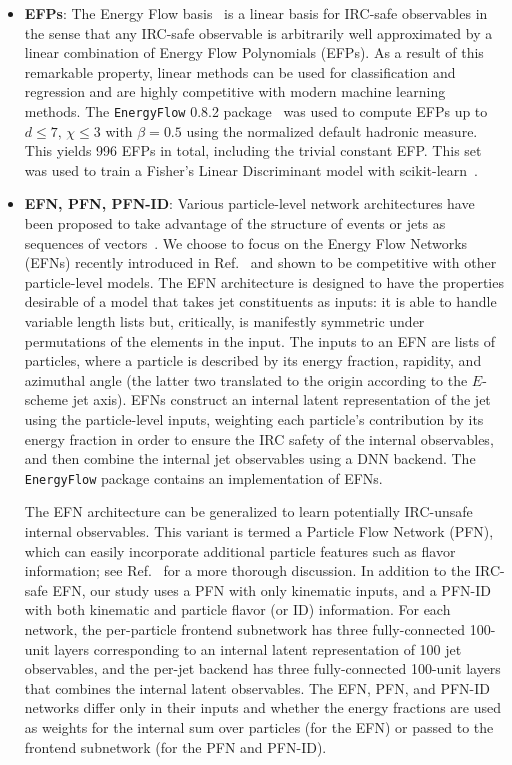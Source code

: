 \documentclass[letterpaper,11pt]{article}
\DeclareRobustCommand{\Ref}[1]{Ref.~\cite{#1}}
\providecommand{\href}[2]{#2}
\begin{document}
\begin{itemize}
\item \textbf{EFPs}: The Energy Flow basis~\cite{Komiske:2017aww} is a linear basis for IRC-safe observables in the sense that any IRC-safe observable is arbitrarily well approximated by a linear combination of Energy Flow Polynomials (EFPs).
%
As a result of this remarkable property, linear methods can be used for classification and regression and are highly competitive with modern machine learning methods.
%
The \href{https://energyflow.network}{\texttt{EnergyFlow}} 0.8.2 package~\cite{energyflow} was used to compute EFPs up to $d\le7,\,\chi\le3$ with $\beta=0.5$ using the normalized default hadronic measure.
%
This yields 996 EFPs in total, including the trivial constant EFP.
%
This set was used to train a Fisher's Linear Discriminant model with scikit-learn~\cite{scikit-learn}.


\item \textbf{EFN, PFN, PFN-ID}:
%
Various particle-level network architectures have been proposed to take advantage of the structure of events or jets as sequences of vectors~\cite{Louppe:2017ipp,Andreassen:2018apy,Butter:2017cot,Cheng:2017rdo,Egan:2017ojy,Komiske:2018cqr}.
%
We choose to focus on the Energy Flow Networks (EFNs) recently introduced in \Ref{Komiske:2018cqr} and shown to be competitive with other particle-level models.
%
The EFN architecture is designed to have the properties desirable of a model that takes jet constituents as inputs: it is able to handle variable length lists but, critically, is manifestly symmetric under permutations of the elements in the input.
%
The inputs to an EFN are lists of particles, where a particle is described by its energy fraction, rapidity, and azimuthal angle (the latter two translated to the origin according to the $E$-scheme jet axis).
%
EFNs construct an internal latent representation of the jet using the particle-level inputs, weighting each particle's contribution by its energy fraction in order to ensure the IRC safety of the internal observables, and then combine the internal jet observables using a DNN backend.
%
The \href{https://energyflow.network}{\texttt{EnergyFlow}} package contains an implementation of EFNs.


The EFN architecture can be generalized to learn potentially IRC-unsafe internal observables.
%
This variant is termed a Particle Flow Network (PFN), which can easily incorporate additional particle features such as flavor information; see \Ref{Komiske:2018cqr} for a more thorough discussion. 
%
In addition to the IRC-safe EFN, our study uses a PFN with only kinematic inputs, and a PFN-ID with both kinematic and particle flavor (or ID) information.
%
For each network, the per-particle frontend subnetwork has three fully-connected 100-unit layers corresponding to an internal latent representation of 100 jet observables, and the per-jet backend has three fully-connected 100-unit layers that combines the internal latent observables.
%
The EFN, PFN, and PFN-ID networks differ only in their inputs and whether the energy fractions are used as weights for the internal sum over particles (for the EFN) or passed to the frontend subnetwork (for the PFN and PFN-ID).

\end{itemize}
\end{document}
